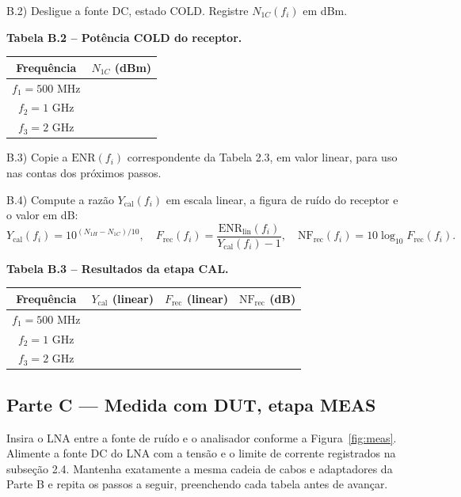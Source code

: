 \documentclass[11pt,a4paper]{article}
\begin{document}
B.2) Desligue a fonte DC, estado COLD. Registre $N_{1C}(f_i)$ em dBm.

\textbf{Tabela B.2 -- Potência COLD do receptor.}

{\renewcommand{\arraystretch}{1.5}
\begin{center}
\begin{tabular}{|c|c|}
\hline
\textbf{Frequência} & \textbf{$N_{1C}$ (dBm)} \\
\hline
$f_1 = 500$ MHz & \\
\hline
$f_2 = 1$ GHz & \\
\hline
$f_3 = 2$ GHz & \\
\hline
\end{tabular}
\end{center}
}

B.3) Copie a $\mathrm{ENR}(f_i)$ correspondente da Tabela 2.3, em valor linear, para uso nas contas dos próximos passos.

B.4) Compute a razão $Y_{\text{cal}}(f_i)$ em escala linear, a figura de ruído do receptor e o valor em dB:
\[
Y_{\text{cal}}(f_i) = 10^{(N_{1H}-N_{1C})/10},
\quad
F_{\text{rec}}(f_i) = \frac{\mathrm{ENR}_{\text{lin}}(f_i)}{Y_{\text{cal}}(f_i)-1},
\quad
\mathrm{NF}_{\text{rec}}(f_i) = 10\log_{10} F_{\text{rec}}(f_i).
\]

\textbf{Tabela B.3 -- Resultados da etapa CAL.}

{\renewcommand{\arraystretch}{1.5}
\begin{center}
\begin{tabular}{|c|c|c|c|}
\hline
\textbf{Frequência} & \textbf{$Y_{\text{cal}}$ (linear)} & \textbf{$F_{\text{rec}}$ (linear)} & \textbf{$\mathrm{NF}_{\text{rec}}$ (dB)} \\
\hline
$f_1 = 500$ MHz & & & \\
\hline
$f_2 = 1$ GHz & & & \\
\hline
$f_3 = 2$ GHz & & & \\
\hline
\end{tabular}
\end{center}
}

\subsection*{Parte C --- Medida com DUT, etapa MEAS}

Insira o LNA entre a fonte de ruído e o analisador conforme a Figura~\ref{fig:meas}. Alimente a fonte DC do LNA com a tensão e o limite de corrente registrados na subseção 2.4. Mantenha exatamente a mesma cadeia de cabos e adaptadores da Parte B e repita os passos a seguir, preenchendo cada tabela antes de avançar.
\end{document}
